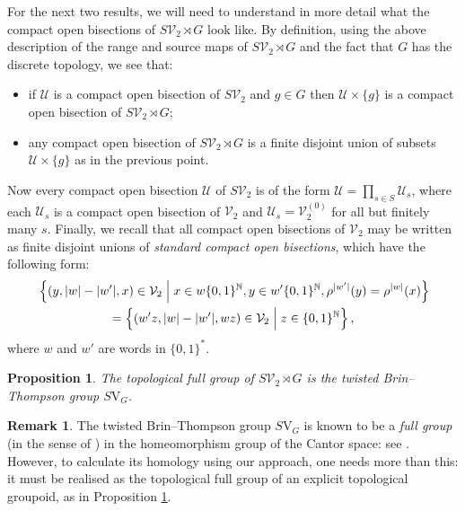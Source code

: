 \documentclass[10pt,a4paper]{amsart}
\numberwithin{equation}{section}
\numberwithin{figure}{section}
\newtheorem{prop}[thm]{Proposition}
\theoremstyle{definition}
\newtheorem{rem}[thm]{Remark}
\newcommand{\cU}{\mathcal{U}}
\newcommand{\cV}{\mathcal{V}}
\newcommand{\bN}{\mathbb{N}}
\begin{document}
For the next two results, we will need to understand in more detail what the compact open bisections of $S\cV_2 \rtimes G$ look like. By definition, using the above description of the range and source maps of $S\cV_2 \rtimes G$ and the fact that $G$ has the discrete topology, we see that:
\begin{itemize}
    \item if $\cU$ is a compact open bisection of $S\cV_2$ and $g \in G$ then $\cU \times \{g\}$ is a compact open bisection of $S\cV_2 \rtimes G$;
    \item any compact open bisection of $S\cV_2 \rtimes G$ is a finite disjoint union of subsets $\cU \times \{g\}$ as in the previous point.
\end{itemize}
Now every compact open bisection $\cU$ of $S\mathcal{V}_2$ is of the form $\cU = \prod_{s \in S} \cU_s$, where each $\cU_s$ is a compact open bisection of $\cV_2$ and $\cU_s = \cV_2^{(0)}$ for all but finitely many $s$. Finally, we recall that all compact open bisections of $\cV_2$ may be written as finite disjoint unions of \emph{standard compact open bisections}, which have the following form:
\begin{align*}
& \left\lbrace (y, \lvert w \rvert - \lvert w' \rvert ,x) \in \cV_2 \Bigm| x\in w\{0,1\}^{\bN}, y\in w'\{0,1\}^{\bN},  \rho^{\lvert w' \rvert}(y) = \rho^{\lvert w \rvert}(x) \right\rbrace \\
&\hspace{2cm} = \left\lbrace (w'z , \lvert w \rvert - \lvert w' \rvert , wz) \in \cV_2 \Bigm| z \in \{0,1\}^\bN \right\rbrace ,
\end{align*}
where $w$ and $w'$ are words in $\{0,1\}^{\ast}$.

\begin{prop}
\label{prop:groupoid-full-grp-svg}
The topological full group of $S\mathcal{V}_2 \rtimes G$ is the twisted Brin--Thompson group $S\mathrm{V}_G$.
\end{prop}

\begin{rem}
The twisted Brin--Thompson group $S\mathrm{V}_G$ is known to be a \emph{full group} (in the sense of \cite[Definition 2.24]{BBMZ23}) in the homeomorphism group of the Cantor space: see \cite[top of p.\ 56]{BBMZ23}. However, to calculate its homology using our approach, one needs more than this: it must be realised as the topological full group of an explicit topological groupoid, as in Proposition \ref{prop:groupoid-full-grp-svg}.
\end{rem}
\end{document}
